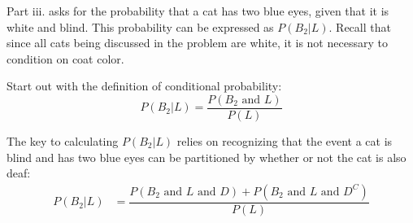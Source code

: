 Part iii. asks for the probability that a cat has two blue eyes, given that it is white and blind. This probability can be expressed as $P(B_2|L)$. Recall that since all cats being discussed in the problem are white, it is not necessary to condition on coat color.

Start out with the definition of conditional probability:
\[P(B_2|L) = \dfrac{P(B_2 \textrm{ and } L)}{P(L)} \]

The key to calculating $P(B_2|L)$ relies on recognizing that the event a cat is blind and has two blue eyes can be partitioned by whether or not the cat is also deaf:
\begin{align}
P(B_2|L) &= \dfrac{P(B_2 \textrm{ and } L \textrm{ and } D) + P(B_2 \textrm{ and } L \textrm{ and } D^C)}{P(L)}
\label{pB2GivenL}
\end{align}

